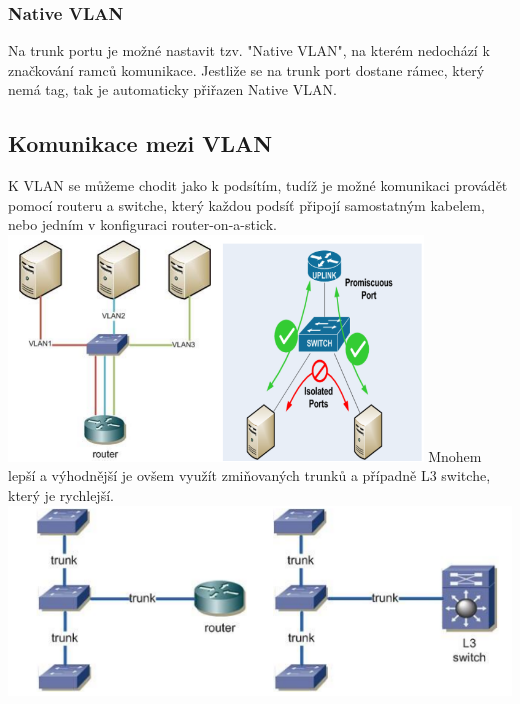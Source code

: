 \subsubsection{Native VLAN}
Na trunk portu je možné nastavit tzv. "Native VLAN", na kterém nedochází k značkování ramců komunikace.
Jestliže se na trunk port dostane rámec, který nemá tag, tak je automaticky přiřazen Native VLAN.
\subsection{Komunikace mezi VLAN}
K VLAN se můžeme chodit jako k podsítím, tudíž je možné komunikaci provádět pomocí routeru a switche, který každou podsíť připojí samostatným kabelem, nebo jedním v konfiguraci router-on-a-stick. \\
\includegraphics[width=\linewidth, height=6cm]{TVY-POS/VLAN/VLAN-router.png}
Mnohem lepší a výhodnější je ovšem využít zmiňovaných trunků a případně L3 switche, který je rychlejší.
\includegraphics[width=\linewidth]{TVY-POS/VLAN/VLAN-trunk.png}